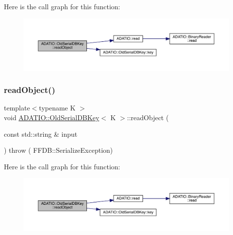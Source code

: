 Here is the call graph for this function\+:
\nopagebreak
\begin{figure}[H]
\begin{center}
\leavevmode
\includegraphics[width=350pt]{dc/d7d/classADATIO_1_1OldSerialDBKey_a4d79b5e8834dc154ddc981e153924ccd_cgraph}
\end{center}
\end{figure}
\mbox{\label{classADATIO_1_1OldSerialDBKey_a4d79b5e8834dc154ddc981e153924ccd}} 
\subsubsection{\texorpdfstring{readObject()}{readObject()}\hspace{0.1cm}{\footnotesize\ttfamily [2/2]}}
{\footnotesize\ttfamily template$<$typename K $>$ \\
void \mbox{\hyperlink{classADATIO_1_1OldSerialDBKey}{A\+D\+A\+T\+I\+O\+::\+Old\+Serial\+D\+B\+Key}}$<$ K $>$\+::read\+Object (\begin{DoxyParamCaption}\item[{const std\+::string \&}]{input }\end{DoxyParamCaption}) throw ( F\+F\+D\+B\+::\+Serialize\+Exception) \hspace{0.3cm}{\ttfamily [inline]}}

Here is the call graph for this function\+:
\nopagebreak
\begin{figure}[H]
\begin{center}
\leavevmode
\includegraphics[width=350pt]{dc/d7d/classADATIO_1_1OldSerialDBKey_a4d79b5e8834dc154ddc981e153924ccd_cgraph}
\end{center}
\end{figure}
\mbox{\label{classADATIO_1_1OldSerialDBKey_af45528e61ba59f1978d3492534dffd46}} 
